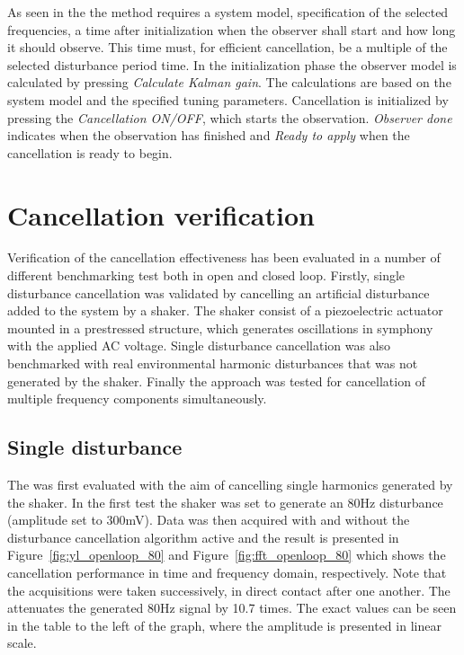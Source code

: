 As seen in the \abbrGUI the method requires a system model, specification of the selected frequencies, a time after initialization when the observer shall start and how long it should observe. This time must, for efficient cancellation, be a multiple of the selected disturbance period time. In the initialization phase the observer model is calculated by pressing \emph{Calculate Kalman gain}. The calculations are based on the system model and the specified tuning parameters. Cancellation is initialized by pressing the \emph{Cancellation ON/OFF}, which starts the observation. \emph{Observer done} indicates when the observation has finished and \emph{Ready to apply} when the cancellation is ready to begin.

\section{Cancellation verification}
Verification of the cancellation effectiveness has been evaluated in a number of different benchmarking test both in open and closed loop. Firstly, single disturbance cancellation was validated by cancelling an artificial disturbance added to the system by a shaker. The shaker consist of a piezoelectric actuator mounted in a prestressed structure, which generates oscillations in symphony with the applied AC voltage. Single disturbance cancellation was also benchmarked with real environmental harmonic disturbances that was not generated by the shaker. Finally the approach was tested for cancellation of multiple frequency components simultaneously.

\subsection{Single disturbance}
The \abbrRFDC was first evaluated with the aim of cancelling single harmonics generated by the shaker. In the first test the shaker was set to generate an 80Hz disturbance (amplitude set to 300mV). Data was then acquired with and without the disturbance cancellation algorithm active and the result is presented in Figure~\ref{fig:yl_openloop_80} and Figure~\ref{fig:fft_openloop_80} which shows the cancellation performance in time and frequency domain, respectively. Note that the acquisitions were taken successively, in direct contact after one another. The \abbrRFDC attenuates the generated 80Hz signal by 10.7 times. The exact values can be seen in the table to the left of the graph, where the amplitude is presented in linear scale.

